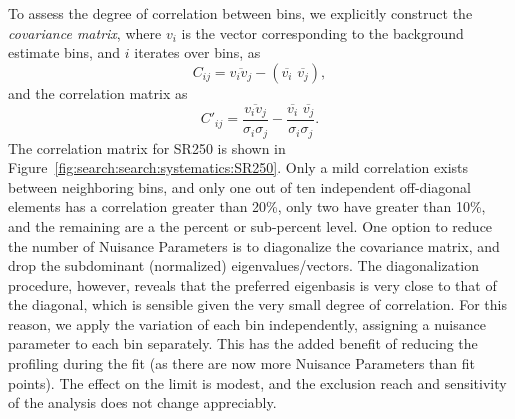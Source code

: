 To assess the degree of correlation between bins, we explicitly construct the \textit{covariance matrix}, where $v_i$ is the vector corresponding to the background estimate bins, and $i$ iterates over bins, as
%
\begin{equation}
C_{ij} = \overline{v_i v_j} - (\overline{v_i}\,\, \overline{v_j}),
\end{equation}
%
\noindent and the correlation matrix as
%
\begin{equation}
C'_{ij} = \frac{\overline{v_i v_j }}{\sigma_i \sigma_j} - \frac{\overline{v_i}\,\,\overline{v_j}}{\sigma_i \sigma_j}.
\end{equation}
%
\noindent The correlation matrix for SR250 is shown in Figure~\ref{fig:search:search:systematics:SR250}. Only a mild correlation exists between neighboring bins, and only one out of ten independent off-diagonal elements has a correlation greater than 20\%, only two have greater than 10\%, and the remaining are a the percent or sub-percent level. One option to reduce the number of Nuisance Parameters is to diagonalize the covariance matrix, and drop the subdominant (normalized) eigenvalues/vectors. The diagonalization procedure, however, reveals that the preferred eigenbasis is very close to that of the diagonal, which is sensible given the very small degree of correlation. For this reason, we apply the variation of each bin independently, assigning a nuisance parameter to each bin separately. This has the added benefit of reducing the profiling during the fit (as there are now more Nuisance Parameters than fit points). The effect on the limit is modest, and the exclusion reach and sensitivity of the analysis does not change appreciably.




